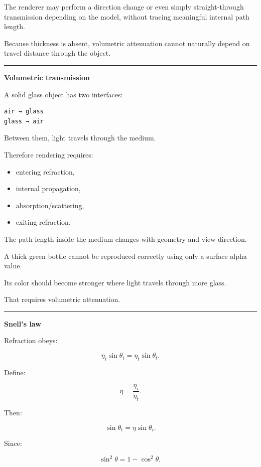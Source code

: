 The renderer may perform a direction change or even simply straight-through transmission depending on the model, without tracing meaningful internal path length.

Because thickness is absent, volumetric attenuation cannot naturally depend on travel distance through the object.

\begin{center}\rule{0.5\linewidth}{0.5pt}\end{center}

\textbf{Volumetric transmission}

A solid glass object has two interfaces:

\begin{verbatim}
air → glass
glass → air
\end{verbatim}

Between them, light travels through the medium.

Therefore rendering requires:

\begin{itemize}
\tightlist
\item
  entering refraction,
\item
  internal propagation,
\item
  absorption/scattering,
\item
  exiting refraction.
\end{itemize}

The path length inside the medium changes with geometry and view direction.

A thick green bottle cannot be reproduced correctly using only a surface alpha value.

Its color should become stronger where light travels through more glass.

That requires volumetric attenuation.

\begin{center}\rule{0.5\linewidth}{0.5pt}\end{center}

\textbf{Snell's law}

Refraction obeys:

\[
\boxed{
\eta_i\sin\theta_i
=
\eta_t\sin\theta_t.
}
\]

Define:

\[
\eta=
\frac{\eta_i}{\eta_t}.
\]

Then:

\[
\sin\theta_t=
\eta\sin\theta_i.
\]

Since:

\[
\sin^2\theta
=
1-\cos^2\theta,
\]

